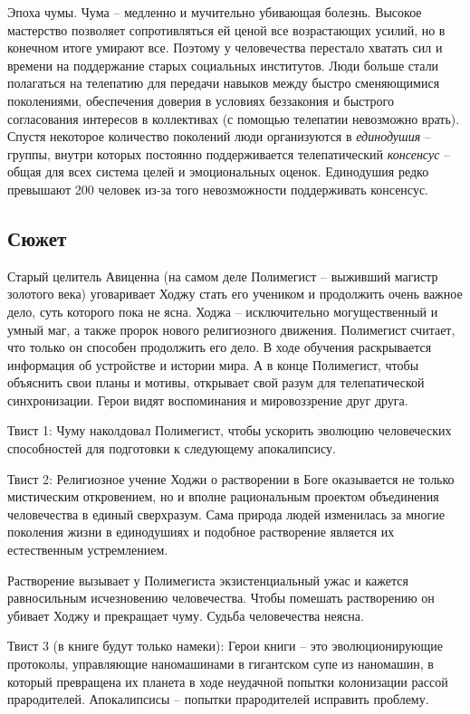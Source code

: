 \documentclass[12pt,a4paper]{article}
\begin{document}
Эпоха чумы. Чума -- медленно и мучительно убивающая болезнь. Высокое мастерство позволяет сопротивляться ей ценой все возрастающих усилий, но в конечном итоге умирают все. Поэтому у человечества перестало хватать сил и времени на поддержание старых социальных институтов. Люди больше стали полагаться на телепатию для передачи навыков между быстро сменяющимися поколениями, обеспечения доверия в условиях беззакония и быстрого согласования интересов в коллективах (с помощью телепатии невозможно врать). Спустя некоторое количество поколений люди организуются в \textit{единодушия} -- группы, внутри которых постоянно поддерживается телепатический \textit{консенсус} -- общая для всех система целей и эмоциональных оценок. Единодушия редко превышают 200 человек из-за того невозможности поддерживать консенсус.

\subsection*{Сюжет}

Старый целитель Авиценна (на самом деле Полимегист -- выживший магистр золотого века) уговаривает Ходжу стать его учеником и продолжить очень важное дело, суть которого пока не ясна. Ходжа -- исключительно могущественный и умный маг, а также пророк нового религиозного движения. Полимегист считает, что только он способен продолжить его дело. В ходе обучения раскрывается информация об устройстве и истории мира. А в конце Полимегист, чтобы объяснить свои планы и мотивы, открывает свой разум для телепатической синхронизации. Герои видят воспоминания и мировоззрение друг друга.

Твист 1: Чуму наколдовал Полимегист, чтобы ускорить эволюцию человеческих способностей для подготовки к следующему апокалипсису.

Твист 2: Религиозное учение Ходжи о растворении в Боге оказывается не только мистическим откровением, но и вполне рациональным проектом объединения человечества в единый сверхразум. Сама природа людей изменилась за многие поколения жизни в единодушиях и подобное растворение является их естественным устремлением.

Растворение вызывает у Полимегиста экзистенциальный ужас и кажется равносильным исчезновению человечества. Чтобы помешать растворению он убивает Ходжу и прекращает чуму. Судьба человечества неясна.

Твист 3 (в книге будут только намеки): Герои книги -- это эволюционирующие протоколы, управляющие наномашинами в гигантском супе из наномашин, в который превращена их планета в ходе неудачной попытки колонизации рассой прародителей. Апокалипсисы -- попытки прародителей исправить проблему.
\end{document}

